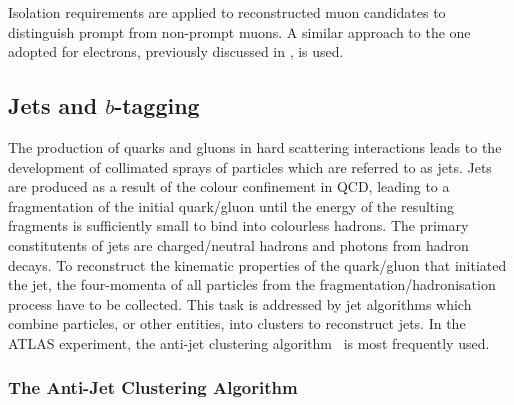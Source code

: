 
Isolation requirements are applied to reconstructed muon candidates to
distinguish prompt from non-prompt muons. A similar approach to the one adopted
for electrons, previously discussed in , is used.


\subsection{Jets and $b$-tagging}%
\label{sec:jet_rec}

The production of quarks and gluons in hard scattering interactions leads to the
development of collimated sprays of particles which are referred to as
jets. Jets are produced as a result of the colour confinement in QCD, leading to
a fragmentation of the initial quark/gluon until the energy of the resulting
fragments is sufficiently small to bind into colourless hadrons. The primary
constitutents of jets are charged/neutral hadrons and photons from hadron
decays. To reconstruct the kinematic properties of the quark/gluon that
initiated the jet, the four-momenta of all particles from the
fragmentation/hadronisation process have to be collected. This task is addressed
by jet algorithms which combine particles, or other entities, into clusters to
reconstruct jets. In the ATLAS experiment, the anti-\kt jet clustering
algorithm~\cite{Cacciari:2008gp} is most frequently used.


\subsubsection{The Anti-\kt Jet Clustering Algorithm}


